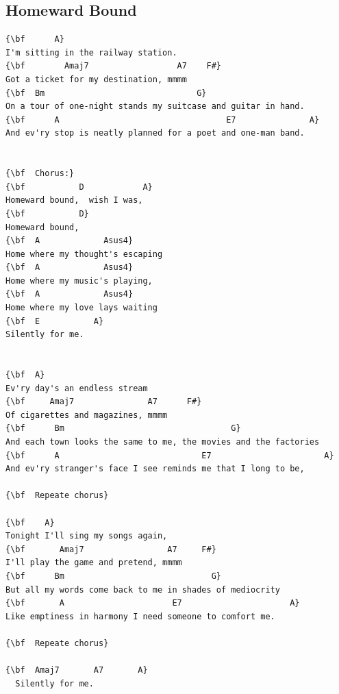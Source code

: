 \documentclass[a4paper]{article}
\begin{document}
\subsection{Homeward Bound}
\begin{Verbatim}[commandchars=\\\{\}]
{\bf      A}
I'm sitting in the railway station.
{\bf        Amaj7                  A7    F#}
Got a ticket for my destination, mmmm
{\bf  Bm                               G}
On a tour of one-night stands my suitcase and guitar in hand.
{\bf      A                                  E7               A}
And ev'ry stop is neatly planned for a poet and one-man band.


{\bf  Chorus:}
{\bf           D            A}
Homeward bound,  wish I was,
{\bf           D}
Homeward bound,
{\bf  A             Asus4}
Home where my thought's escaping
{\bf  A             Asus4}
Home where my music's playing,
{\bf  A             Asus4}
Home where my love lays waiting
{\bf  E           A}
Silently for me.


{\bf  A}
Ev'ry day's an endless stream
{\bf     Amaj7               A7      F#}
Of cigarettes and magazines, mmmm
{\bf      Bm                                  G}
And each town looks the same to me, the movies and the factories
{\bf      A                             E7                       A}
And ev'ry stranger's face I see reminds me that I long to be,

{\bf  Repeate chorus}

{\bf    A}
Tonight I'll sing my songs again,
{\bf       Amaj7                 A7     F#}
I'll play the game and pretend, mmmm
{\bf      Bm                              G}
But all my words come back to me in shades of mediocrity
{\bf       A                      E7                      A}
Like emptiness in harmony I need someone to comfort me.

{\bf  Repeate chorus}

{\bf  Amaj7       A7       A}
  Silently for me.

\end{Verbatim}
\newpage
\end{document}
